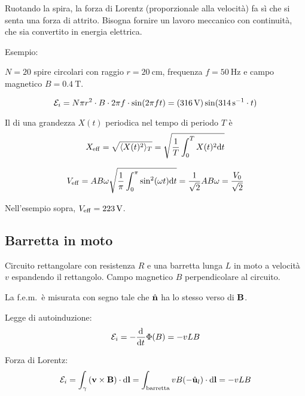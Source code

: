 Ruotando la spira, la forza di Lorentz (proporzionale alla velocità) fa sì che si senta una forza di attrito.
Bisogna fornire un lavoro meccanico con continuità, che sia convertito in energia elettrica.

Esempio:

$N = 20$ spire circolari con raggio $r = \qty{20}{\centi\metre}$, frequenza $f = \qty{50}{\hertz}$ e campo magnetico $B = \qty{0.4}{\tesla}$.

\begin{equation}
    \mathcal{E}_i = N \pi r^2 \cdot B \cdot 2\pi f \cdot \sin(2\pi f t)
    = (\qty{316}{\volt}) \sin(\qty{314}{\per\second} \cdot t)
\end{equation}

Il  di una grandezza $X(t)$ periodica nel tempo di periodo $T$ è
\begin{equation}
    X_\mathrm{eff} = \sqrt{\langle X(t)^2 \rangle_T}
    = \sqrt{\frac{1}{T} \int_0^T X(t)^2 \mathrm{d} t}
\end{equation}

\begin{equation}
    V_\mathrm{eff} = AB\omega \sqrt{\frac{1}{\pi} \int_0^\pi \sin^2(\omega t) \mathrm{d} t}
    = \frac{1}{\sqrt{2}} A B \omega
    = \frac{V_0}{\sqrt{2}}
\end{equation}

Nell'esempio sopra, $V_\mathrm{eff} = \qty{223}{\volt}$.

\subsection{Barretta in moto}


Circuito rettangolare con resistenza $R$ e una barretta lunga $L$ in moto a velocità $v$ espandendo il rettangolo.
Campo magnetico $B$ perpendicolare al circuito.

La f.e.m.\ è misurata con segno tale che $\hat{\mathbf{n}}$ ha lo stesso verso di $\mathbf{B}$.

Legge di autoinduzione:
\begin{equation}
    \fem_i = - \der{t} \Phi(B) = - v L B
\end{equation}

Forza di Lorentz:
\begin{equation}
    \mathcal{E}_i = \int_\gamma \left( \mathbf{v} \times \mathbf{B} \right) \cdot \mathrm{d} \mathbf{l}
    = \int_\text{barretta} v B (-\hat{\mathbf{u}}_{l}) \cdot \mathrm{d} \mathbf{l}
    = - v L B
\end{equation}

